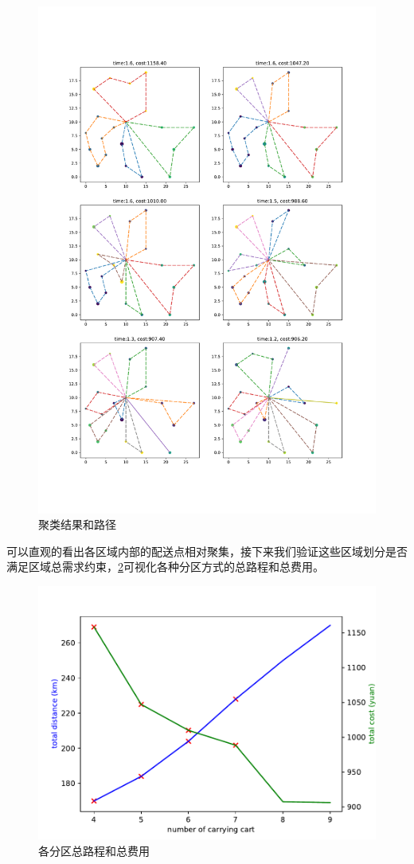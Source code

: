 \documentclass{cumcmthesis}
\begin{document}
    \begin{figure}[H]
        \centering
        \includegraphics[width=.95\textwidth]{figure//path_mutiTS_6pic.pdf}
        \caption{聚类结果和路径}
        \label{fig:path_mutiTS}
    \end{figure}

    可以直观的看出各区域内部的配送点相对聚集，接下来我们验证这些区域划分是否满足区域总需求约束，\cref{fig:distance_cost_line}可视化各种分区方式的总路程和总费用。

    \begin{figure}[H]
        \centering
        \includegraphics[width=.7\textwidth]{figure//distance_cost_line.pdf}
        \caption{各分区总路程和总费用}
        \label{fig:distance_cost_line}
    \end{figure}
\end{document}
